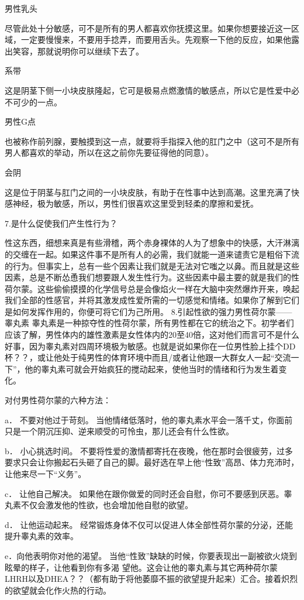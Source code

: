 \documentclass[12pt,UTF8,openany]{ctexbook}
\begin{document}
男性乳头

尽管此处十分敏感，可不是所有的男人都喜欢你抚摸这里。如果你想要接近这一区域，一定要慢慢来，不要用手捻弄，而要用舌头。先观察一下他的反应，如果他露出笑容，那就说明你可以继续下去了。

系带

这是阴茎下侧一小块皮肤隆起，它可是极易点燃激情的敏感点，所以它是性爱中必不可少的一点。

男性G点

也被称作前列腺，要触摸到这一点，就要将手指探入他的肛门之中（这可不是所有男人都喜欢的举动，所以在这之前你先要征得他的同意）。

会阴

这是位于阴茎与肛门之间的一小块皮肤，有助于在性事中达到高潮。这里充满了快感神经，极为敏感，所以，男性们很喜欢这里受到轻柔的摩擦和爱抚。

7.是什么促使我们产生性行为？

性这东西，细想来真是有些滑稽，两个赤身裸体的人为了想象中的快感，大汗淋漓的交缠在一起。如果这件事不是所有人的必需，我们就能一道来谴责它是粗俗下流的行为。但事实上，总有一些个因素让我们就是无法对它嗤之以鼻。而且就是这些因素，总是不断怂恿我们想要跟人发生性行为。这些因素中最主要的就是我们的性荷尔蒙。这些偷偷摸摸的化学信号总是会像焰火一样在大脑中突然爆炸开来，唤起我们全部的性感官，并将其激发成性爱所需的一切感觉和情绪。如果你了解到它们是如何发挥作用的，你便可将它们为己所用。
8.引起性欲的强力男性荷尔蒙——睾丸素
睾丸素是一种掠夺性的性荷尔蒙，所有男性都在它的统治之下。初学者们应该了解，男性体内的雄性激素是女性体内的20至40倍，这对他们而言可不是什么好事，因为睾丸素对四周环境极为敏感。也就是说如果你在一位男性脸上挂个DD杯？？，或让他处于纯男性的体育环境中而且/或者让他跟一大群女人一起“交流一下”，他的睾丸素可就会开始疯狂的搅动起来，使他当时的情绪和行为发生着变化。

对付男性荷尔蒙的六种方法：

a． 不要对他过于苛刻。
当他情绪低落时，他的睾丸素水平会一落千丈，你面前只是一个阴沉压抑、逆来顺受的可怜虫，那儿还会有什么性欲。

b． 小心挑选时间。
不要将性爱的激情都寄托在夜晚，他在那时会很疲劳，过多要求只会让你搬起石头砸了自己的脚。最好选在早上他“性致”高昂、体力充沛时，让他来尽一下“义务”。

c． 让他自己解决。
如果他在跟你做爱的同时还会自慰，你可不要感到厌恶。睾丸素不仅会激发他的性欲，也会增加他自慰的欲望。

d． 让他运动起来。
经常锻炼身体不仅可以促进人体全部性荷尔蒙的分泌，还能提升睾丸素的效率。

e．向他表明你对他的渴望。
当他“性致”缺缺的时候，你要表现出一副被欲火烧到眩晕的样子，让他看到你有多渴 望他。这会让他的睾丸素与其它两种荷尔蒙LHRH以及DHEA？？（都有助于将他萎靡不振的欲望提升起来）汇合。接着炽烈的欲望就会化作火热的行动。
\end{document}
